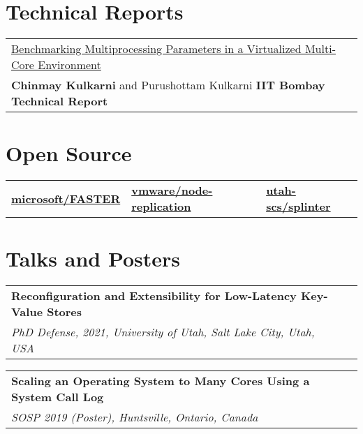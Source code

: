 \documentclass[margin,line]{res}
\begin{document}
\begin{resume}
\section{\sc Technical Reports}
\begin{tabular}{@{}p{5.5in}p{4in}}
\href{https://chinkulkarni.github.io/public/TR-CSE-2015-76.pdf}
{Benchmarking Multiprocessing Parameters in a Virtualized Multi-Core
Environment}\\
{\small{\bf Chinmay Kulkarni} and Purushottam Kulkarni} \hfill
{\small\bf IIT Bombay Technical Report}\\
\end{tabular}

\section{\sc Open Source}
\begin{tabular}{@{}p{2in}p{2in}p{2in}}
\href{{https://github.com/microsoft/FASTER}}{{\bf microsoft/FASTER}}
&
%
\href{{https://github.com/vmware/node-replication}}{{\bf vmware/node-replication}}
&
%
\href{{https://github.com/utah-scs/splinter}}
{{\bf utah-scs/splinter}}
\end{tabular}

\section{\sc Talks and Posters}
\begin{tabular}{@{}p{5.5in}p{4in}}
{\bf Reconfiguration and Extensibility for Low-Latency Key-Value Stores}\\
{\small\em PhD Defense, 2021, University of Utah, Salt Lake City, Utah, USA}\\
\end{tabular}

\vspace{-7pt}
\begin{tabular}{@{}p{5.5in}p{4in}}
{\bf Scaling an Operating System to Many Cores Using a System Call Log}\\
{\small\em SOSP 2019 (Poster), Huntsville, Ontario, Canada}\\
\end{tabular}


\end{resume}
\end{document}
